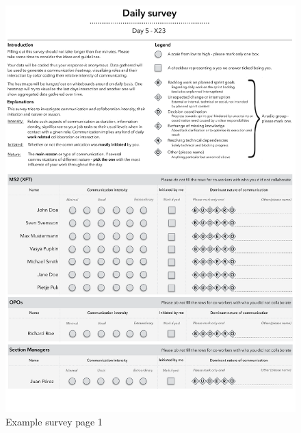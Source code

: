 \begin{figure}[h!]
  \includegraphics[width=1.0\textwidth]{figures/fake-survey-1.pdf}
  \centering
  \caption{Example survey page 1}
  \label{fig:fake-survey-1}
\end{figure}

